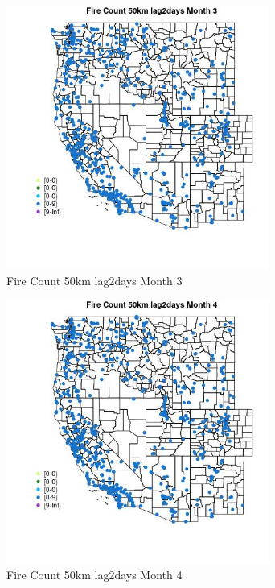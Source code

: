 \begin{figure} 
\centering  
\includegraphics[width=0.77\textwidth]{Code_Outputs/Report_ML_input_PM25_Step4_part_e_de_duplicated_aves_compiled_2019-05-21wNAs_MapObsMo3Fire_Count_50km_lag2days.jpg} 
\caption{\label{fig:Report_ML_input_PM25_Step4_part_e_de_duplicated_aves_compiled_2019-05-21wNAsMapObsMo3Fire_Count_50km_lag2days}Fire Count 50km lag2days Month 3} 
\end{figure} 
 

\begin{figure} 
\centering  
\includegraphics[width=0.77\textwidth]{Code_Outputs/Report_ML_input_PM25_Step4_part_e_de_duplicated_aves_compiled_2019-05-21wNAs_MapObsMo4Fire_Count_50km_lag2days.jpg} 
\caption{\label{fig:Report_ML_input_PM25_Step4_part_e_de_duplicated_aves_compiled_2019-05-21wNAsMapObsMo4Fire_Count_50km_lag2days}Fire Count 50km lag2days Month 4} 
\end{figure} 
 

